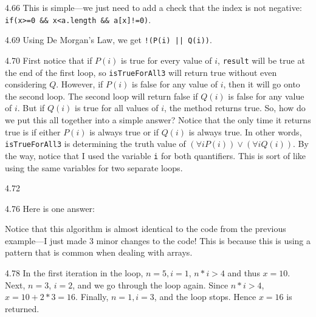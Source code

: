 \begin{Answer}{4.66}
 This is simple---we just need to add a check
that the index is not negative:\\
\verb+if(x>=0 && x<a.length && a[x]!=0)+.
\end{Answer}
\begin{Answer}{4.69}
Using De Morgan's Law, we get \verb+!(P(i) || Q(i))+.
\end{Answer}
\begin{Answer}{4.70}
First notice that if $P(i)$ is true for every value of $i$, \verb+result+ will be true at the
end of the first loop, so  \verb+isTrueForAll3+ will return true without even considering $Q$.
However, if $P(i)$ is false for any value of $i$, then it will go onto the second loop.
The second loop will return false if $Q(i)$ is false for any value of $i$.  But if $Q(i)$ is true
for all values of $i$, the method returns true.
So, how do we put this all together into a simple answer?
Notice that the only time it returns true is if either $P(i)$ is always true or if $Q(i)$ is always true.
In other words,  \verb+isTrueForAll3+ is determining the truth value of $(\forall i P(i)) \vee (\forall i Q(i))$.
By the way, notice that I used the variable \verb+i+ for both quantifiers. This is sort of like using
the same variables for two separate loops.
\end{Answer}
\begin{Answer}{4.72}
\end{Answer}
\begin{Answer}{4.76}
Here is one answer:
\begin{code}
int sequentialSearch(int []a, int n, int val) {
    int i=0;
    while(i<n) {
       if( a[i]==val ) {
           return i;
       }
       i++;
   }
   return -1;
\end{code}
Notice that this algorithm is almost identical to the code from
the previous example---I just made 3 minor changes to the code!
This is because this is using a pattern that is common when
dealing with arrays.
\end{Answer}
\begin{Answer}{4.78}
 In the first iteration in the loop,
$n = 5, i = 1$, $n*i > 4$ and thus $x = 10.$
Next, $n = 3$, $i = 2$, and we go through the loop again.
Since $n*i > 4$, $x = 10 + 2*3 = 16$.
Finally, $n = 1, i = 3$, and the loop stops. Hence $x = 16$ is
returned.
\end{Answer}
